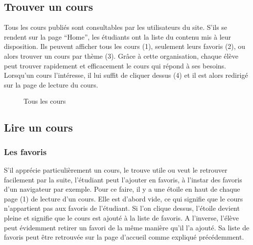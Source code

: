 \documentclass[letterpaper,10pt,oneside]{sphinxmanual}
\begin{document}
\subsection{Trouver un cours}
\label{functionalities:trouver-un-cours}
Tous les cours publiés sont consultables par les utilisateurs du site. S'ils se rendent sur la page ``Home'', les étudiants ont la liste du contenu mis à leur disposition. Ils peuvent afficher tous les cours (1), seulement leurs favoris (2), ou alors trouver un cours par thème (3). Grâce à cette organisation, chaque élève peut trouver rapidement et efficacement le cours qui répond à ses besoins. Lorsqu'un cours l'intéresse, il lui suffit de cliquer dessus (4) et il est alors redirigé sur la page de lecture du cours.
\begin{figure}[htbp]
\centering
\capstart

\caption{Tous les cours}\end{figure}


\subsection{Lire un cours}
\label{functionalities:lire-un-cours}

\subsubsection{Les favoris}
\label{functionalities:les-favoris}
S'il apprécie particulièrement un cours, le trouve utile ou veut le retrouver facilement par la suite, l'étudiant peut l'ajouter en favoris, à l'instar des favoris d'un navigateur par exemple. Pour ce faire, il y a une étoile en haut de chaque page (1) de lecture d'un cours. Elle est d'abord vide, ce qui signifie que le cours n'appartient pas aux favoris de l'étudiant. Si l'on clique dessus, l'étoile devient pleine et signifie que le cours est ajouté à la liste de favoris. A l'inverse, l'élève peut évidemment retirer un favori de la même manière qu'il l'a ajouté. Sa liste de favoris peut être retrouvée sur la page d'accueil comme expliqué précédemment.
\end{document}
